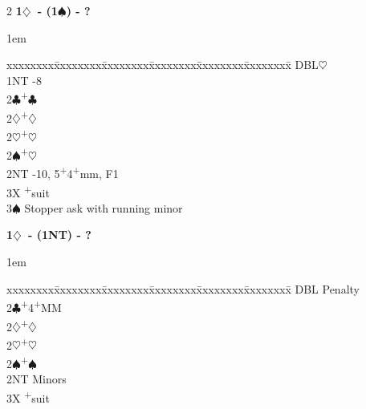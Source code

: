 \documentclass[10pt]{article}
\renewcommand{\c}{$\clubsuit$}
\renewcommand{\d}{$\diamondsuit$}
\newcommand{\h}{$\heartsuit$}
\newcommand{\s}{$\spadesuit$}
\newcommand{\p}{\textsuperscript{+}}
\newcommand{\x}{DBL}
\newenvironment{bidtable}[1][]
{\textbf{#1}
  \begin{adjustwidth}{1em}{}
    \addvspace{2pt}
    \begin{tabbing}
      xxxxxxxx\=xxxxxxxx\=xxxxxxxx\=xxxxxxxx\=xxxxxxxx\=xxxxxxxx\=\kill}
{\end{tabbing}\end{adjustwidth}\bigskip}%
\begin{document}
\begin{multicols*}{2}
\begin{bidtable}[1\d\ - (1\s) - ?]
\x  {}\h                            \\
1NT -8                            \\
2\c {}\p\c                          \\
2\d {}\p\d                          \\
2\h {}\p\h                          \\
2\s {}\p\h                          \\
2NT -10, 5\p4\p mm, F1            \\
3X  \p suit                       \\
3\s \> Stopper ask with running minor \\
\end{bidtable}

\begin{bidtable}[1\d\ - (1NT) - ?]
\x  \> Penalty                        \\
2\c {}\p 4\p MM                     \\
2\d {}\p\d                          \\
2\h {}\p\h                          \\
2\s {}\p\s                          \\
2NT \> Minors                         \\
3X  \p suit                       \\
\end{bidtable}


\end{multicols*}
\end{document}
